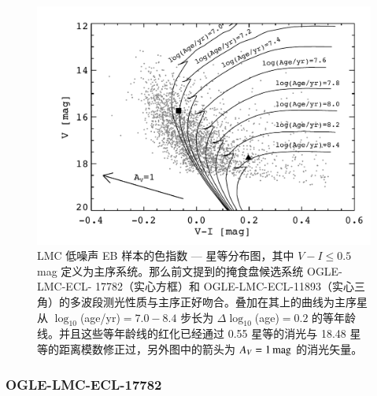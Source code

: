 \begin{figure}[t]
\centering
\includegraphics[width=1.0\textwidth]{figures/chapter3/f13_isotracks.pdf}
\caption[ LMC 低噪声 EB 样本的颜色 --- 星等分布图，其中 $V - I \le 0.5 $ mag 定义为主序系统。那么前文提到的掩食盘候选系统 OGLE-LMC-ECL- 17782（实心方框）和 OGLE-LMC-ECL-11893（实心三角）的多波段测光性质与主序正好吻合。叠加在其上的曲线为主序星从 $\log_{10}$(age/yr)$=7.0-8.4$ 步长为 $\Delta \log_{10}$(age)$=0.2$ 的等年龄线（Marigo et al. 2008）。并且这些等年龄线的红化已经通过 0.55 星等的消光与 18.48 星等的距离模数修正过，另外图中的箭头为 $A_{V}=1\,\rm{mag}$ 的消光矢量。]{ LMC 低噪声 EB 样本的色指数 --- 星等分布图，其中 $V - I \le 0.5 $ mag 定义为主序系统。那么前文提到的掩食盘候选系统 OGLE-LMC-ECL- 17782（实心方框）和 OGLE-LMC-ECL-11893（实心三角）的多波段测光性质与主序正好吻合。叠加在其上的曲线为主序星从 $\log_{10}$(age/yr)$=7.0-8.4$ 步长为 $\Delta \log_{10}$(age)$=0.2$ 的等年龄线\cite{Marigo2008}。并且这些等年龄线的红化已经通过 0.55 星等的消光与 18.48 星等的距离模数修正过，另外图中的箭头为 $A_{V}=1\,\rm{mag}$ 的消光矢量。}
\label{fig:lmctracks}
\end{figure}


\subsubsection{OGLE-LMC-ECL-17782} \label{sec:lmc17782}

